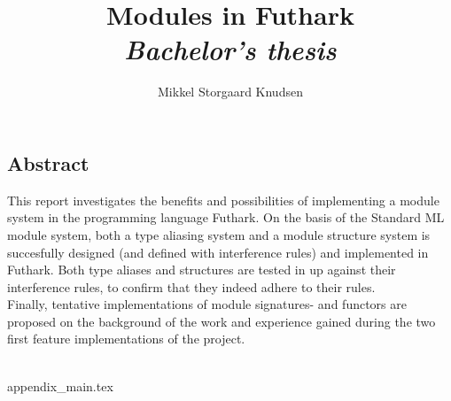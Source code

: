 \documentclass[12pt]{article}
\title{
  Modules in Futhark \\
\textit{Bachelor's thesis}
}
\author{Mikkel Storgaard Knudsen}
\begin{document}
\maketitle

\subsection*{Abstract}
\label{subsec:abstract}
This report investigates the benefits and possibilities of implementing a module system in the programming language Futhark. On the basis of the Standard ML module system, both a type aliasing system and a module structure system is succesfully designed (and defined with interference rules) and implemented in Futhark.
Both type aliases and structures are tested in up against their interference rules, to confirm that they indeed adhere to their rules.\\
Finally, tentative implementations of module signatures- and functors are proposed on the background of the work and experience gained during the two first feature implementations of the project.
\\\\
\clearpage
\tableofcontents
\clearpage

\clearpage

\clearpage

\clearpage

\clearpage

\clearpage









{appendix_main.tex}



\end{document}
